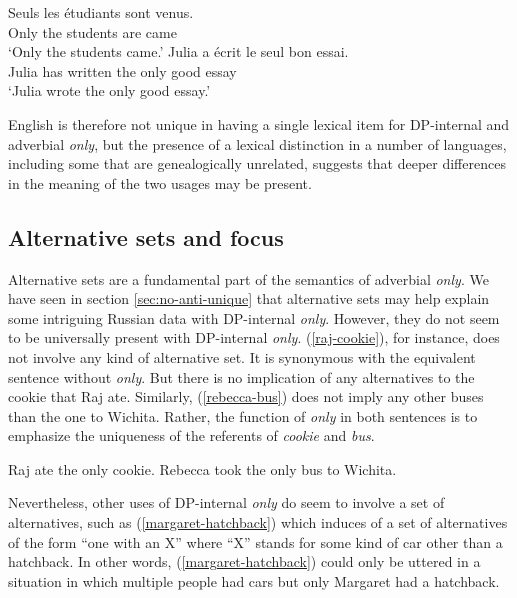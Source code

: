 \begin{exe}
	\ex \gll Seuls les \'{e}tudiants sont venus.\\
	Only the students are came\\
	\glt `Only the students came.'
	\ex \gll Julia a \'{e}crit le seul bon essai.\\
	Julia has written the only good essay\\
	\glt `Julia wrote the only good essay.'
\end{exe}

English is therefore not unique in having a single lexical item for DP-internal and adverbial \textit{only}, but the presence of a lexical distinction in a number of languages, including some that are genealogically unrelated, suggests that deeper differences in the meaning of the two usages may be present.

\subsection{Alternative sets and focus}
Alternative sets are a fundamental part of the semantics of adverbial \textit{only}. We have seen in section \ref{sec:no-anti-unique} that alternative sets may help explain some intriguing Russian data with DP-internal \textit{only}. However, they do not seem to be universally present with DP-internal \textit{only}. (\ref{raj-cookie}), for instance, does not involve any kind of alternative set. It is synonymous with the equivalent sentence without \textit{only}. But there is no implication of any alternatives to the cookie that Raj ate. Similarly, (\ref{rebecca-bus}) does not imply any other buses than the one to Wichita. Rather, the function of \textit{only} in both sentences is to emphasize the uniqueness of the referents of \textit{cookie} and \textit{bus}.

\begin{exe}
	\ex \label{raj-cookie} Raj ate the only cookie.
	\ex \label{rebecca-bus} Rebecca took the only bus to Wichita.
\end{exe}

Nevertheless, other uses of DP-internal \textit{only} do seem to involve a set of alternatives, such as (\ref{margaret-hatchback}) which induces of a set of alternatives of the form ``one with an X'' where ``X'' stands for some kind of car other than a hatchback. In other words, (\ref{margaret-hatchback}) could only be uttered in a situation in which multiple people had cars but only Margaret had a hatchback.

